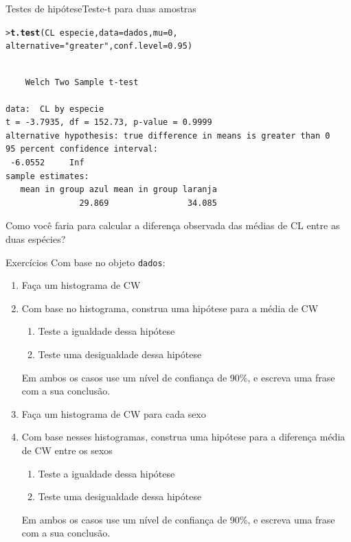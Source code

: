 \documentclass[10pt]{beamer}\usepackage{graphicx, color}
\makeatletter
\newcommand{\hlfunctioncall}[1]{\textcolor[rgb]{0,0,0.545098039215686}{\textbf{#1}}}%
\newcommand{\hlstring}[1]{\textcolor[rgb]{0.282352941176471,0.23921568627451,0.545098039215686}{#1}}%
\newenvironment{kframe}{%
 \def\at@end@of@kframe{}%
 \ifinner\ifhmode%
  \def\at@end@of@kframe{\end{minipage}}%
  \begin{minipage}{\columnwidth}%
 \fi\fi%
 \def\FrameCommand##1{\hskip\@totalleftmargin \hskip-\fboxsep
 \colorbox{shadecolor}{##1}\hskip-\fboxsep
     \hskip-\linewidth \hskip-\@totalleftmargin \hskip\columnwidth}%
 \MakeFramed {\advance\hsize-\width
   \@totalleftmargin\z@ \linewidth\hsize
   \@setminipage}}%
 {\par\unskip\endMakeFramed%
 \at@end@of@kframe}
\newenvironment{knitrout}{}{} %
\makeatother
\begin{document}
\begin{frame}[fragile=singleslide]{Testes de hipótese}{Teste-t para duas amostras}
\begin{knitrout}\small
{}\color{fgcolor}\begin{kframe}
\begin{alltt}
> \hlfunctioncall{t.test}(CL ~ especie, data = dados, mu = 0,
         alternative = \hlstring{"greater"}, conf.level = 0.95)
\end{alltt}
\begin{verbatim}

	Welch Two Sample t-test

data:  CL by especie 
t = -3.7935, df = 152.73, p-value = 0.9999
alternative hypothesis: true difference in means is greater than 0 
95 percent confidence interval:
 -6.0552     Inf 
sample estimates:
   mean in group azul mean in group laranja 
               29.869                34.085 

\end{verbatim}
\end{kframe}
\end{knitrout}

Como você faria para calcular a diferença observada das médias de CL
entre as duas espécies?
\end{frame}

\begin{frame}[fragile=singleslide]{Exercícios}
Com base no objeto \texttt{dados}:
  \begin{enumerate}
  \item Faça um histograma de CW
  \item Com base no histograma, construa uma hipótese para a média de CW
    \begin{enumerate}
    \item Teste a igualdade dessa hipótese
    \item Teste uma desigualdade dessa hipótese
    \end{enumerate}
    Em ambos os casos use um nível de confiança de 90\%, e escreva uma
    frase com a sua conclusão.
  \item Faça um histograma de CW para cada sexo
  \item Com base nesses histogramas, construa uma hipótese para a
    diferença média de CW entre os sexos
    \begin{enumerate}
    \item Teste a igualdade dessa hipótese
    \item Teste uma desigualdade dessa hipótese
    \end{enumerate}
    Em ambos os casos use um nível de confiança de 90\%, e escreva uma
    frase com a sua conclusão.
  \end{enumerate}
\end{frame}
\end{document}
